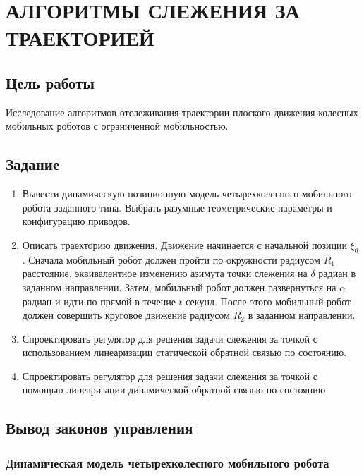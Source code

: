 \chapter{АЛГОРИТМЫ СЛЕЖЕНИЯ ЗА ТРАЕКТОРИЕЙ}

\section{Цель работы}

Исследование алгоритмов отслеживания траектории плоского движения колесных мобильных роботов с ограниченной мобильностью.

\section{Задание}

\begin{enumerate}
\item Вывести динамическую позиционную модель четырехколесного мобильного робота заданного типа. Выбрать разумные геометрические параметры и конфигурацию приводов.

\item Описать траекторию движения. Движение начинается с начальной позиции $\xi_0$. Сначала мобильный робот должен пройти по окружности радиусом $R_1$ расстояние, эквивалентное изменению азимута точки слежения на $\delta$ радиан в заданном направлении. Затем, мобильный робот должен развернуться на $\alpha$ радиан и идти по прямой в течение $t$ секунд. После этого мобильный робот должен совершить круговое движение радиусом $R_2$ в заданном направлении.

\item Спроектировать регулятор для решения задачи слежения за точкой с использованием линеаризации статической обратной связью по состоянию.

\item Спроектировать регулятор для решения задачи слежения за точкой с помощью линеаризации динамической обратной связью по состоянию.
\end{enumerate}

\section{Вывод законов управления}

\subsection{Динамическая модель четырехколесного мобильного робота}

